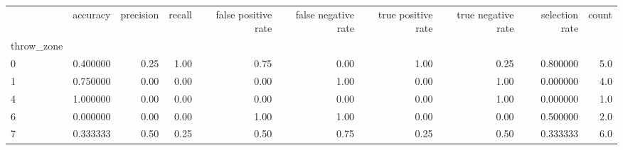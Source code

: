 \begin{tabular}{lrrrrrrrrr}
\toprule
{} &  accuracy &  precision &  recall &  false positive rate &  false negative rate &  true positive rate &  true negative rate &  selection rate &  count \\
throw\_zone &           &            &         &                      &                      &                     &                     &                 &        \\
\midrule
0          &  0.400000 &       0.25 &    1.00 &                 0.75 &                 0.00 &                1.00 &                0.25 &        0.800000 &    5.0 \\
1          &  0.750000 &       0.00 &    0.00 &                 0.00 &                 1.00 &                0.00 &                1.00 &        0.000000 &    4.0 \\
4          &  1.000000 &       0.00 &    0.00 &                 0.00 &                 0.00 &                0.00 &                1.00 &        0.000000 &    1.0 \\
6          &  0.000000 &       0.00 &    0.00 &                 1.00 &                 1.00 &                0.00 &                0.00 &        0.500000 &    2.0 \\
7          &  0.333333 &       0.50 &    0.25 &                 0.50 &                 0.75 &                0.25 &                0.50 &        0.333333 &    6.0 \\
\bottomrule
\end{tabular}
